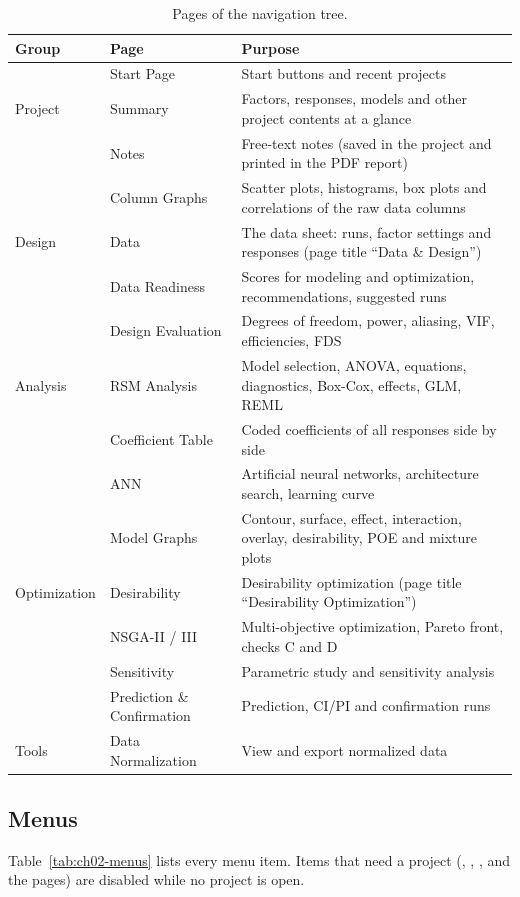 \begin{table}[htbp]
\centering
\caption{Pages of the navigation tree.}
\label{tab:ch02-pages}
\small
\begin{tabularx}{\linewidth}{@{}llX@{}}
\toprule
Group & Page & Purpose \\
\midrule
 & Start Page & Start buttons and recent projects \\
Project & Summary & Factors, responses, models and other project contents at a glance \\
 & Notes & Free-text notes (saved in the project and printed in the PDF report) \\
 & Column Graphs & Scatter plots, histograms, box plots and correlations of the raw data columns \\
Design & Data & The data sheet: runs, factor settings and responses (page title ``Data \& Design'') \\
 & Data Readiness & Scores for modeling and optimization, recommendations, suggested runs \\
 & Design Evaluation & Degrees of freedom, power, aliasing, VIF, efficiencies, FDS \\
Analysis & RSM Analysis & Model selection, ANOVA, equations, diagnostics, Box-Cox, effects, GLM, REML \\
 & Coefficient Table & Coded coefficients of all responses side by side \\
 & ANN & Artificial neural networks, architecture search, learning curve \\
 & Model Graphs & Contour, surface, effect, interaction, overlay, desirability, POE and mixture plots \\
Optimization & Desirability & Desirability optimization (page title ``Desirability Optimization'') \\
 & NSGA-II / III & Multi-objective optimization, Pareto front, checks C and D \\
 & Sensitivity & Parametric study and sensitivity analysis \\
 & Prediction \& Confirmation & Prediction, CI/PI and confirmation runs \\
Tools & Data Normalization & View and export normalized data \\
\bottomrule
\end{tabularx}
\end{table}

\subsection{Menus}
\label{sec:ch02-menus}
Table~\ref{tab:ch02-menus} lists every menu item. Items that need a project (, ,
,  and the pages) are disabled while no project is open.

